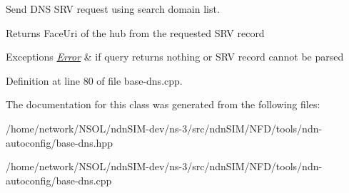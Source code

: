 Send D\+NS S\+RV request using search domain list. 

\begin{DoxyReturn}{Returns}
Face\+Uri of the hub from the requested S\+RV record 
\end{DoxyReturn}

\begin{DoxyExceptions}{Exceptions}
{\em \hyperlink{classndn_1_1tools_1_1autoconfig_1_1BaseDns_1_1Error}{Error}} & if query returns nothing or S\+RV record cannot be parsed \\
\hline
\end{DoxyExceptions}


Definition at line 80 of file base-\/dns.\+cpp.



The documentation for this class was generated from the following files\+:\begin{DoxyCompactItemize}
\item 
/home/network/\+N\+S\+O\+L/ndn\+S\+I\+M-\/dev/ns-\/3/src/ndn\+S\+I\+M/\+N\+F\+D/tools/ndn-\/autoconfig/base-\/dns.\+hpp\item 
/home/network/\+N\+S\+O\+L/ndn\+S\+I\+M-\/dev/ns-\/3/src/ndn\+S\+I\+M/\+N\+F\+D/tools/ndn-\/autoconfig/base-\/dns.\+cpp\end{DoxyCompactItemize}
